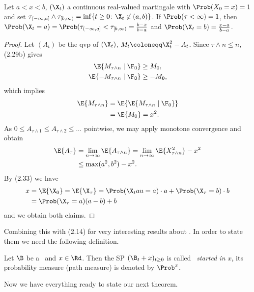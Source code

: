 \begin{prop}
	Let $a<x<b$, $(\X_t)$ a continuous real-valued martingale with
	$\Prob(X_0=x)=1$ and set $\tau_{(-\infty,a]}\wedge
	\tau_{[b,\infty)}=\inf\{t\geq 0 \colon \X_t \not \in (a,b)\}$.
	If $\Prob(\tau<\infty)=1$, then $\Prob(\X_t=a)=\Prob(\tau_{(-\infty,a]}<\tau_{[b,\infty)}
	=\frac{b-x}{b-a}$ and $\Prob(\X_t=b)=\frac{x-a}{b-a}$.
\end{prop}
\begin{proof}
	Let $(A_t)$ be the qvp of $(\X_t)$, $M_t\coloneqq \X_t^2-A_t$.
	Since $\tau \wedge n\leq n$, (2.29b) gives
	\begin{align*}
		\E{M_{\tau \wedge n}\mid \F_0}&\geq M_0,\\
		\E{-M_{\tau\wedge n} \mid \F_0} &\geq -M_0,
	\end{align*}
	which implies 
	\begin{align*}
	\E{M_{\tau \wedge n}}&=\E{\E{M_{\tau \wedge n} \mid \F_0}}\\
	&=\E{M_0}=x^2.
	\end{align*}
	As $0 \leq A_{\tau \wedge 1}\leq A_{\tau\wedge 2} \leq \dots$
	pointwise, we may apply monotone convergence and obtain
	\begin{align*}
	\E{A_\tau}&=\lim_{n \to \infty} \E{A_{\tau \wedge n}}=
	\lim_{n\to \infty} \E{X_{\tau \wedge n}^2}-x^2\\
	&\leq \max(a^2,b^2)-x^2.
	\end{align*}
	By (2.33) we have
	\begin{align*}
		x&=\E{\X_0}=\E{\X_\tau} =\Prob(\X_tau=a)\cdot a +
		\Prob(\X_\tau=b)\cdot b\\
		&=\Prob(\X_\tau =a)(a-b)+b
	\end{align*}
	and we obtain both claims.
\end{proof}

Combining this with (2.14) for very interesting results about \BM.
In order to state them we need the following definition.

\begin{defi}
	Let $\B$ be a \BMd\ and $x \in \Rd$.
	Then the SP $(\B_t+x)_{t \geq 0}$ is called \emph{\BMd\ started
	in $x$}, its probability measure (path measure) is denoted
	by $\Prob^x$.
\end{defi}

Now we have everything ready to state our next theorem.

